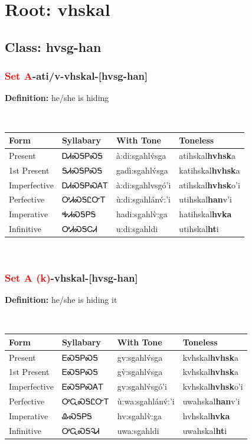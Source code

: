 \needspace{4in}
\section*{Root: vhskal}
\nopagebreak
{}
\needspace{3in}
\subsection*{Class: hvsg-han}
\nopagebreak
\needspace{2in}
\subsubsection*{\textcolor{Red}{Set A}{-}ati/v{-}\textbf{vhskal}{-}[hvsg-han]}
\nopagebreak
\textbf{Definition: } he/she is hiding
\\[0.5em]
\begin{tabularx}{\textwidth}{l X X X}%
\toprule%
\textbf{Form}&\textbf{Syllabary}&\textbf{With Tone}&\textbf{Toneless}\\%
\midrule%
Present&ᎠᏗᏍᎦᏢᏍᎦ&à:di:sgahlv́sga&atihskal\textbf{hvhsk}a\\%
1st Present&ᎦᏗᏍᎦᏢᏍᎦ&gadì:sgahlv́sga&katihskal\textbf{hvhsk}a\\%
Imperfective&ᎠᏗᏍᎦᏢᏍᎪᎢ&à:di:sgahlvsgó’i&atihskal\textbf{hvhsk}o'i\\%
Perfective&ᎤᏗᏍᎦᏝᏅᎢ&ù:di:sgahlánv́:’i&utihskal\textbf{han}v'i\\%
Imperative&ᎭᏗᏍᎦᏢᎦ&hadi:sgahlv̀:ga&hatihskal\textbf{hvka}\\%
Infinitive&ᎤᏗᏍᎦᏟᏗ&u:di:sgahldi&utihskal\textbf{ht}i\\%
\bottomrule%
\end{tabularx}
\\[1em]
\needspace{2in}
\subsubsection*{\textcolor{Red}{Set A (k)}{-}\textbf{vhskal}{-}[hvsg-han]}
\nopagebreak
\textbf{Definition: } he/she is hiding it
\\[0.5em]
\begin{tabularx}{\textwidth}{l X X X}%
\toprule%
\textbf{Form}&\textbf{Syllabary}&\textbf{With Tone}&\textbf{Toneless}\\%
\midrule%
Present&ᎬᏍᎦᏢᏍᎦ&gv:sgahlv́sga&kvhskal\textbf{hvhsk}a\\%
1st Present&ᎬᏍᎦᏢᏍᎦ&gv̀:sgahlv́sga&kvhskal\textbf{hvhsk}a\\%
Imperfective&ᎬᏍᎦᏢᏍᎪᎢ&gv:sgahlv́sgó’i&kvhskal\textbf{hvhsk}o'i\\%
Perfective&ᎤᏩᏍᎦᏝᏅᎢ&ù:wa:sgahlánv́:’i&uwahskal\textbf{han}v'i\\%
Imperative&ᎲᏍᎦᏢᎦ&hv:sgahlv̀:ga&hvhskal\textbf{hvka}\\%
Infinitive&ᎤᏩᏍᎦᎸᏗ&uwa:sgahldi&uwahskal\textbf{ht}i\\%
\bottomrule%
\end{tabularx}
\\[1em]
\needspace{2in}
